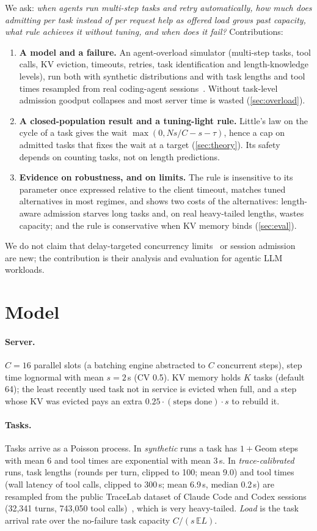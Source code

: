 \documentclass[10pt,twocolumn,letterpaper]{article}
\begin{document}
We ask: \emph{when agents run multi-step tasks and retry automatically, how much does admitting per task instead of per request help as offered load grows past capacity, what rule achieves it without tuning, and when does it fail?}
Contributions:
\begin{enumerate}
\item \textbf{A model and a failure.} An agent-overload simulator (multi-step tasks, tool calls, KV eviction, timeouts, retries, task identification and length-knowledge levels), run both with synthetic distributions and with task lengths and tool times resampled from real coding-agent sessions~\citep{tracelab2026}. Without task-level admission goodput collapses and most server time is wasted (\cref{sec:overload}).
\item \textbf{A closed-population result and a tuning-light rule.} Little's law on the cycle of a task gives the wait $\max(0,Ns/C-s-\tau)$, hence a cap on admitted tasks that fixes the wait at a target (\cref{sec:theory}). Its safety depends on counting tasks, not on length predictions.
\item \textbf{Evidence on robustness, and on limits.} The rule is insensitive to its parameter once expressed relative to the client timeout, matches tuned alternatives in most regimes, and shows two costs of the alternatives: length-aware admission starves long tasks and, on real heavy-tailed lengths, wastes capacity; and the rule is conservative when KV memory binds (\cref{sec:eval}).
\end{enumerate}
We do not claim that delay-targeted concurrency limits~\citep{welsh2001seda,zhou2018dagor,cho2020breakwater,netflixconcurrency} or session admission~\citep{cherkasova2002sbac} are new; the contribution is their analysis and evaluation for agentic LLM workloads.

\section{Model}
\paragraph{Server.} $C{=}16$ parallel slots (a batching engine abstracted to $C$ concurrent steps), step time lognormal with mean $s{=}2$\,s (CV 0.5). KV memory holds $K$ tasks (default 64); the least recently used task not in service is evicted when full, and a step whose KV was evicted pays an extra $0.25\cdot(\text{steps done})\cdot s$ to rebuild it.
\paragraph{Tasks.} Tasks arrive as a Poisson process. In \emph{synthetic} runs a task has $1+\text{Geom}$ steps with mean 6 and tool times are exponential with mean 3\,s. In \emph{trace-calibrated} runs, task lengths (rounds per turn, clipped to 100; mean 9.0) and tool times (wall latency of tool calls, clipped to 300\,s; mean 6.9\,s, median 0.2\,s) are resampled from the public TraceLab dataset of Claude Code and Codex sessions (32{,}341 turns, 743{,}050 tool calls)~\citep{tracelab2026}, which is very heavy-tailed. \emph{Load} is the task arrival rate over the no-failure task capacity $C/(s\,\mathbb{E}L)$.
\end{document}
